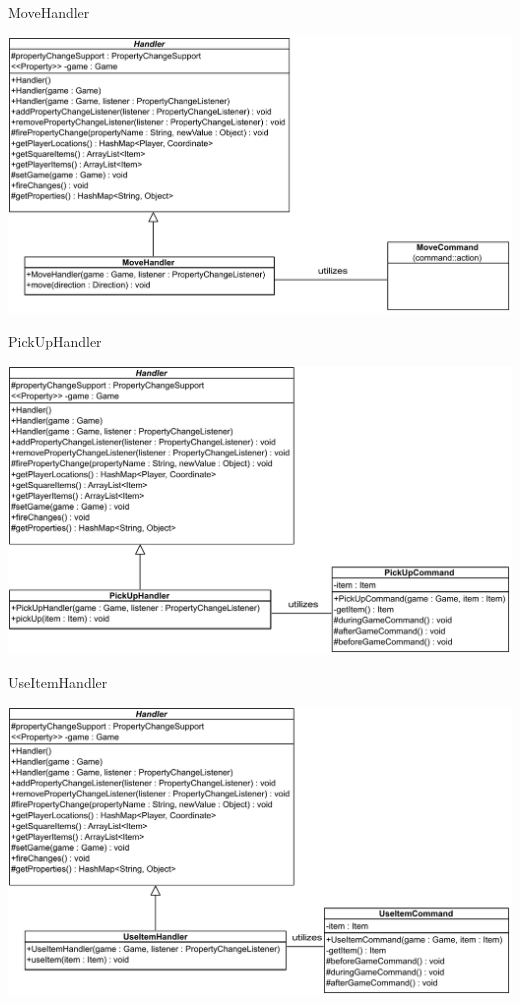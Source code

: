 \documentclass[11pt,t]{beamer}
\begin{document}
\begin{frame}{MoveHandler}
\begin{center}
\includegraphics[scale=0.45]{images/movehandler}
\end{center}
\end{frame}

\begin{frame}{PickUpHandler}
\begin{center}
\includegraphics[scale=0.45]{images/pickuphandler}
\end{center}
\end{frame}

\begin{frame}{UseItemHandler}
\begin{center}
\includegraphics[scale=0.45]{images/useitemhandler}
\end{center}
\end{frame}
\end{document}
